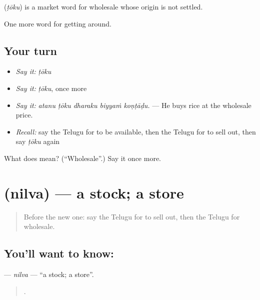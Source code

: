 \begin{cousinweb}
\textbf{} (\emph{ṭōku}) is a market word for wholesale whose origin is not settled.
\end{cousinweb}

\begin{grammarlens}[title={What you've built}]
One more word for getting around.
\end{grammarlens}

\subsection*{Your turn}
\begin{itemize}
\raggedright
  \item \emph{Say it:} \emph{ṭōku}
  \item \emph{Say it:} \emph{ṭōku}, once more
  \item \emph{Say it:} \emph{atanu ṭōku dharaku biyyaṁ koṇṭāḍu.} — He buys rice at the wholesale price.
  \item \emph{Recall:} say the Telugu for to be available, then the Telugu for to sell out, then say \emph{ṭōku} again
\end{itemize}

\begin{tcolorbox}[breakable,colback=teal!4,colframe=teal!35!black,title={Before you move on}]
What does  mean? (\textquotedblleft{}Wholesale\textquotedblright{}.) Say it once more.
\end{tcolorbox}
\section[\texorpdfstring{\te{నిల్వ} (nilva)}{నిల్వ (nilva)}]{ (nilva) — a stock; a store}

\label{lesson:TE-C488-nilva}



\begin{quote}
Before the new one: say the Telugu for to sell out, then the Telugu for wholesale.
\end{quote}

\subsection*{You'll want to know: }
\textbf{} — \emph{nilva} — \textquotedblleft{}a stock; a store\textquotedblright{}.

\begin{quote}
   .
\end{quote}

